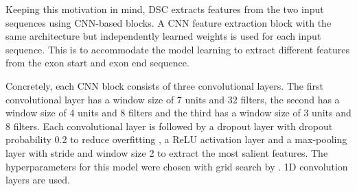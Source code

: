 Keeping this motivation in mind, DSC extracts features from the two input sequences using CNN-based blocks. A CNN feature extraction block with the same architecture but independently learned weights is used for each input sequence. This is to accommodate the model learning to extract different features from the exon start and exon end sequence.

Concretely, each CNN block consists of three convolutional layers. The first convolutional layer has a window size of 7 units and 32 filters, the second has a window size of 4 units and 8 filters and the third has a window size of 3 units and 8 filters. Each convolutional layer is followed by a dropout layer with dropout probability 0.2 to reduce overfitting \cite{dropout}, a ReLU activation layer \cite{relu} and a max-pooling layer with stride and window size 2 to extract the most salient features. The hyperparameters for this model were chosen with grid search by \cite{dsc}. 1D convolution layers are used. 





